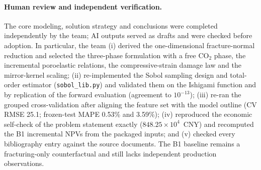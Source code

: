 \paragraph{Human review and independent verification.}
The core modeling, solution strategy and conclusions were completed
independently by the team; AI outputs served as drafts and were checked before
adoption. In particular, the team (i) derived the one-dimensional
fracture-normal reduction and selected the three-phase formulation with a free
CO$_2$ phase, the incremental poroelastic relations, the compressive-strain
damage law and the mirror-kernel scaling; (ii) re-implemented the Sobol
sampling design and total-order estimator (\texttt{sobol\_lib.py}) and
validated them on the Ishigami function and by replication of the forward
evaluation (agreement to $10^{-13}$); (iii) re-ran the grouped cross-validation
after aligning the feature set with the model outline (CV RMSE 25.1;
frozen-test MAPE 0.53\% and 3.59\%); (iv) reproduced the economic self-check of
the problem statement exactly ($848.25\times10^4$~CNY) and recomputed the B1
incremental NPVs from the packaged inputs; and (v) checked every bibliography
entry against the source documents. The B1 baseline remains a
fracturing-only counterfactual and still lacks independent production
observations.
